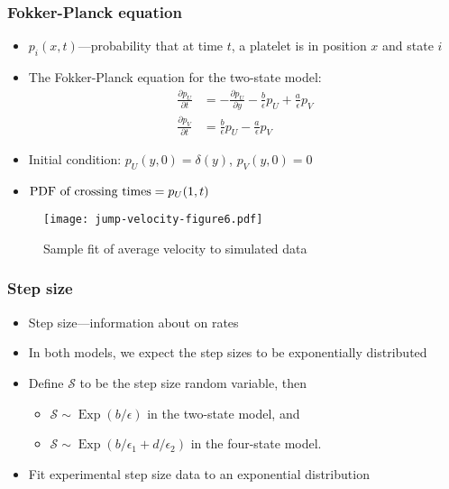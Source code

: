 \documentclass{beamer}
\newcommand{\tn}{\textnormal}
\newcommand{\Pder}[2]{\frac{\partial #1}{\partial #2}}
\DeclareMathOperator{\Exp}{Exp}
\begin{document}
\begin{frame}
  \frametitle{Fokker-Planck equation}
  \begin{itemize}
  \item $p_i(x, t)$---probability that at time $t$, a platelet is in
    position $x$ and state $i$
  \item The Fokker-Planck equation for the two-state model:
    \begin{align}
      \Pder{p_U}{t} &= -\Pder{p_U}{y} - \frac{b}{\epsilon} p_U +
                      \frac{a}{\epsilon} p_V \\ 
      \Pder{p_V}{t} &= \frac{b}{\epsilon} p_U - \frac{a}{\epsilon} p_V
    \end{align}
  \item Initial condition: $p_U(y, 0) = \delta(y)$, $p_V(y, 0) = 0$
  \item $\tn{PDF of crossing times} = p_U(1, t)$
  \end{itemize}
\end{frame}

\begin{frame}
  \begin{figure}
    \centering
    \texttt{[image: jump-velocity-figure6.pdf]}
    \caption{Sample fit of average velocity to simulated data}
    \label{fig:avg-vel-fit}
  \end{figure}
\end{frame}

\begin{frame}
  \frametitle{Step size}
  \begin{itemize}
  \item Step size---information about on rates
  \item In both models, we expect the step sizes to be exponentially
    distributed
  \item Define $\mathcal{S}$ to be the step size random variable, then
    \begin{itemize}
    \item $\mathcal{S} \sim \Exp(b/\epsilon)$ in the two-state model, and
    \item $\mathcal{S} \sim \Exp(b/\epsilon_1 + d/\epsilon_2)$ in the four-state model.
    \end{itemize}
  \item Fit experimental step size data to an exponential distribution
  \end{itemize}
\end{frame}
\end{document}
